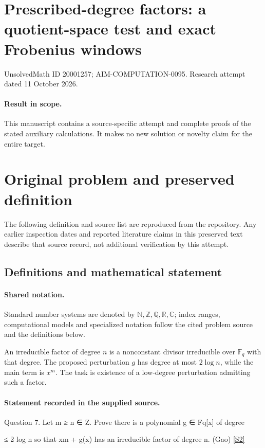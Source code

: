 \documentclass[11pt]{article}
\begin{document}
\section*{Prescribed-degree factors: a quotient-space test and exact Frobenius windows}
\noindent UnsolvedMath ID 20001257; AIM-COMPUTATION-0095. Research attempt dated 11 October 2026.
\paragraph{Result in scope.}This manuscript contains a source-specific attempt and complete proofs of the stated auxiliary calculations. It makes no new solution or novelty claim for the entire target.
\section{Original problem and preserved definition}
The following definition and source list are reproduced from the repository. Any earlier inspection dates and reported literature claims in this preserved text describe that source record, not additional verification by this attempt.
\subsection{Definitions and mathematical statement}

\paragraph{Shared notation.}Standard number systems are denoted by $\mathbb N,\mathbb Z,\mathbb Q,\mathbb R,\mathbb C$; index ranges, computational models and specialized notation follow the cited problem source and the definitions below.


An irreducible factor of degree $n$ is a nonconstant divisor irreducible over $\mathbb F_q$ with that degree. The proposed perturbation $g$ has degree at most $2\log n$, while the main term is $x^m$. The task is existence of a low-degree perturbation admitting such a factor.
\paragraph{Statement recorded in the supplied source.}
Question 7. Let m ≥ n ∈ Z. Prove there is a polynomial g ∈ Fq[x] of degree

≤ 2 log n so that xm + g(x) has an irreducible factor of degree n. (Gao) \href{https://aimath.org/WWN/primesinp/primesinp.pdf}{[S2]}
\end{document}
